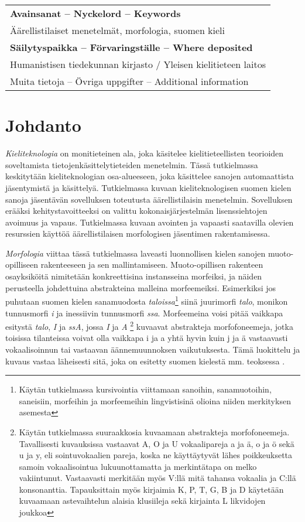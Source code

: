 \documentclass[free]{flammie}
\begin{document}
\begin{tabular}{|l|}
    \hline
    \bf Avainsanat – Nyckelord – Keywords \\
    Äärellistilaiset menetelmät, morfologia, suomen kieli \\
    \hline
    \bf Säilytyspaikka – Förvaringställe – Where deposited \\
    Humanistisen tiedekunnan kirjasto / Yleisen kielitieteen laitos \\
    \hline
    Muita tietoja – Övriga uppgifter – Additional information \\
    \hline
\end{tabular}
\newpage

\section{Johdanto}

\textit{Kieliteknologia} on monitieteinen ala, joka käsitelee kielitieteellisten
teorioiden soveltamista tietojenkäsittelytieteiden menetelmin. Tässä
tutkielmassa keskitytään kieliteknologian osa-alueeseen, joka käsittelee sanojen
automaattista jäsentymistä ja käsittelyä. Tutkielmassa kuvaan kieliteknologisen
suomen kielen sanoja jäsentävän sovelluksen toteutusta äärellistilaisin
menetelmin. Sovelluksen erääksi kehitystavoitteeksi on valittu
kokonaisjärjestelmän lisenssiehtojen avoimuus ja vapaus. Tutkielmassa kuvaan
avointen ja vapaasti saatavilla olevien resurssien käyttöä äärellistilaisen
morfologisen jäsentimen rakentamisessa.

\textit{Morfologia} viittaa tässä tutkielmassa laveasti luonnollisen kielen sanojen
muoto-opilliseen rakenteeseen ja sen mallintamiseen. Muoto-opillisen rakenteen
osayksiköitä nimitetään konkreettisina instansseina morfeiksi, ja näiden
perusteella johdettuina abstrakteina malleina morfeemeiksi. Esimerkiksi jos
puhutaan suomen kielen sanamuodosta \textit{taloissa}\footnote{Käytän tutkielmassa
kursivointia viittamaan sanoihin, sanamuotoihin, saneisiin, morfeihin ja
morfeemeihin lingvistisinä olioina niiden merkityksen asemesta} siinä juurimorfi
\textit{talo}, monikon tunnusmorfi \textit{i} ja inessiivin tunnusmorfi
\textit{ssa}.  Morfeemeina voisi
pitää vaikkapa esitystä \textit{talo}, \textit{I} ja \textit{ssA}, jossa
\textit{I} ja \textit{A} \footnote{Käytän
tutkielmassa suuraakkosia kuvaamaan abstrakteja morfofoneemeja.  Tavallisesti
kuvauksissa vastaavat A, O ja U vokaalipareja a ja ä, o ja ö sekä u ja y, eli
sointuvokaalien pareja, koska ne käyttäytyvät lähes poikkeuksetta samoin
vokaalisointua lukuunottamatta ja merkintätapa on melko vakiintunut.
Vastaavasti merkitään myös V:llä mitä tahansa vokaalia ja C:llä konsonanttia.
Tapauksittain myös kirjaimia K, P, T, G, B ja D käytetään kuvaamaan
astevaihtelun alaisia klusiileja sekä kirjainta L likvidojen joukkoa} kuvaavat
abstrakteja morfofoneemeja, jotka toisissa tilanteissa voivat olla vaikkapa i ja
a yhtä hyvin kuin j ja ä vastaavasti vokaalisoinnun tai vastaavan
äännemuunnoksen vaikutuksesta. Tämä luokittelu ja kuvaus vastaa läheisesti sitä,
joka on esitetty suomen kielestä mm. teoksessa \cite{karlsson1998suomen}.
\end{document}
